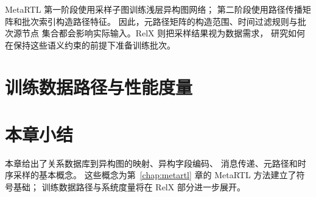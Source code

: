 MetaRTL 第一阶段使用采样子图训练浅层异构图网络；
第二阶段使用路径传播矩阵和批次索引构造路径特征。
因此，元路径矩阵的构造范围、时间过滤规则与批次源节点
集合都会影响实际输入。RelX 则把采样结果视为数据需求，
研究如何在保持这些语义约束的前提下准备训练批次。

\section{训练数据路径与性能度量}

\section{本章小结}

本章给出了关系数据库到异构图的映射、异构字段编码、
消息传递、元路径和时序采样的基本概念。
这些概念为第~\ref{chap:metartl} 章的 MetaRTL 方法建立了符号基础；
训练数据路径与系统度量将在 RelX 部分进一步展开。
